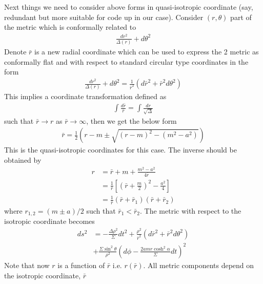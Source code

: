 \documentclass[%
 reprint,
 amsmath,amssymb,
 aps,
]{revtex4-1}
\begin{document}
Next things we need to consider above forms in quasi-isotropic coordinate (say, redundant but more suitable for code up in our case).  Consider $(r,\theta)$ part of the metric which is conformally related to
\begin{align}
\frac{dr^2}{\Delta(r)} + d\theta^2
\end{align}
Denote $\bar{r}$ is a new radial coordinate which can be used to express the 2 metric as conformally flat and with respect to standard circular type coordinates in the form
\begin{align}
\frac{dr^2}{\Delta(r)} + d\theta^2 = \frac{1}{\bar{r}^2} (d \bar{r}^2 + \bar{r}^2 d \theta^2)
\end{align}
This implies a coordinate transformation defined as
\begin{align}
\int \frac{d \bar{r}}{\bar{r}} = \int \frac{dr}{\sqrt{\Delta}}
\end{align}
such that $\bar{r} \rightarrow r$ as $\bar{r} \rightarrow \infty$, then we get the below form 
\begin{align}
\bar{r} = \frac{1}{2} ( r-m \pm \sqrt{(r-m)^2 - (m^2 - a^2)})
\end{align}
This is the quasi-isotropic coordinates for this case. The inverse should be obtained by
\begin{align}
r &= \bar{r} + m + \frac{m^2 - a^2}{4 \bar{r}} \nonumber \\
  &= \frac{1}{\bar{r}} \left[ \left(\bar{r} +\frac{m}{2} \right)^2 - \frac{a^2}{4} \right] \nonumber \\
  &= \frac{1}{\bar{r}} (\bar{r} + \bar{r}_1)(\bar{r} + \bar{r}_2)
\end{align}
where $r_{1,2} = (m \pm a)/2$ such that $\bar{r}_1 < \bar{r}_2$. The metric with respect to the isotropic coordinate becomes
\begin{align}
ds^2 &= - \frac{\Delta \rho^2}{\Sigma} dt^2 + \frac{\rho^2}{\bar{r}^2} (d \bar{r}^2 + \bar{r}^2 d \theta^2) \nonumber \\
&+ \frac{\Sigma \sin^2 \theta}{\rho^2} \left(d \phi - \frac{2 a m r \cosh^2 \alpha}{\Sigma} dt \right)^2
\end{align}
Note that now $r$ is a function of $\bar{r}$ i.e. $r(\bar{r})$. All metric components depend on the isotropic coordinate, $\bar{r}$
\end{document}
